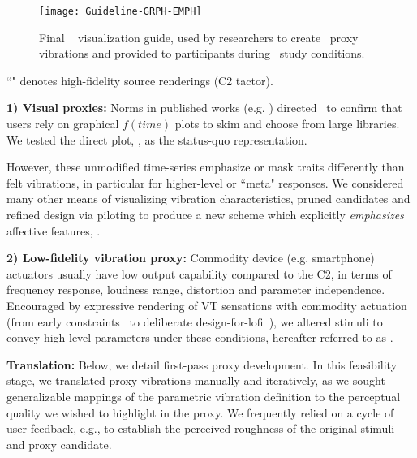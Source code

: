         \begin{figure*}
        \centering
                \texttt{[image: Guideline-GRPH-EMPH]}
                \caption{Final \linear~ visualization guide, used by researchers to create \linear~proxy vibrations and provided to participants during \linear~study conditions.}
            \label{fig:vis:ref:guideline}
    \end{figure*}

``\hifi" denotes high-fidelity source renderings (C2 tactor).

\textbf{1)	Visual proxies:} 
Norms in published works (e.g. \cite{Chan2008}) directed~\cite{Seifi2015} to confirm that users %
rely on graphical $f(time)$ plots to skim and choose from large libraries.  We tested the direct plot, \original, as the status-quo representation.

However, these unmodified time-series emphasize or mask traits differently than felt vibrations, in particular for higher-level or ``meta" responses. %
We considered many other means of visualizing vibration characteristics, pruned candidates and refined design via piloting to produce a new scheme which explicitly \textit{emphasizes} affective features, \linear.


\textbf{2)	Low-fidelity vibration proxy:} 
Commodity device (e.g. smartphone) actuators usually have low output capability compared to the C2, in terms of frequency response, loudness range, distortion and parameter independence. Encouraged %
by expressive rendering of VT sensations with commodity actuation (from early constraints~\cite{Chan2008} to deliberate design-for-lofi~\cite{Israr2015}), we altered stimuli to convey high-level parameters under these conditions,
hereafter referred to as \lofi.

\textbf{Translation:} 
Below, we detail first-pass proxy development.
In this feasibility stage,  we translated proxy vibrations manually and iteratively, as we sought generalizable mappings of the parametric vibration definition to the perceptual quality we wished to highlight in the proxy. We frequently relied on a cycle of user feedback, e.g., to establish the perceived  roughness of the original stimuli and proxy candidate. 

